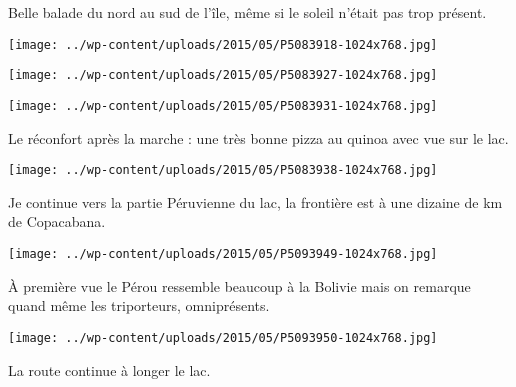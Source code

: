  

 Belle balade du nord au sud de l'île, même si le soleil n'était pas trop présent. 

 

\begin{center} \texttt{[image: ../wp-content/uploads/2015/05/P5083918-1024x768.jpg]} \end{center}

 

 

\begin{center} \texttt{[image: ../wp-content/uploads/2015/05/P5083927-1024x768.jpg]} \end{center}

 

 

\begin{center} \texttt{[image: ../wp-content/uploads/2015/05/P5083931-1024x768.jpg]} \end{center}

 

 Le réconfort après la marche : une très bonne pizza au quinoa avec vue sur le lac. 

 

\begin{center} \texttt{[image: ../wp-content/uploads/2015/05/P5083938-1024x768.jpg]} \end{center}

 

 Je continue vers la partie Péruvienne du lac, la frontière est à une dizaine de km de Copacabana. 

 

\begin{center} \texttt{[image: ../wp-content/uploads/2015/05/P5093949-1024x768.jpg]} \end{center}

 

 À première vue le Pérou ressemble beaucoup à la Bolivie mais on remarque quand même les triporteurs, omniprésents. 

 

\begin{center} \texttt{[image: ../wp-content/uploads/2015/05/P5093950-1024x768.jpg]} \end{center}

 

 La route continue à longer le lac. 

 


